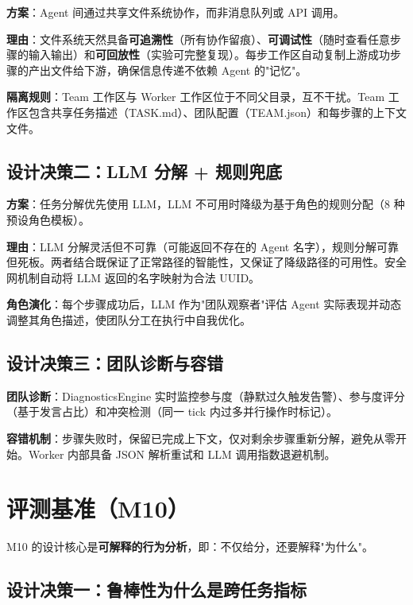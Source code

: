 \documentclass[12pt,a4paper]{article}%
\begin{document}
\textbf{方案}：Agent 间通过共享文件系统协作，而非消息队列或 API 调用。

\textbf{理由}：文件系统天然具备\textbf{可追溯性}（所有协作留痕）、\textbf{可调试性}（随时查看任意步骤的输入输出）和\textbf{可回放性}（实验可完整复现）。每步工作区自动复制上游成功步骤的产出文件给下游，确保信息传递不依赖 Agent 的"记忆"。

\textbf{隔离规则}：Team 工作区与 Worker 工作区位于不同父目录，互不干扰。Team 工作区包含共享任务描述（TASK.md）、团队配置（TEAM.json）和每步骤的上下文文件。

\subsection{设计决策二：LLM 分解 + 规则兜底}

\textbf{方案}：任务分解优先使用 LLM，LLM 不可用时降级为基于角色的规则分配（8 种预设角色模板）。

\textbf{理由}：LLM 分解灵活但不可靠（可能返回不存在的 Agent 名字），规则分解可靠但死板。两者结合既保证了正常路径的智能性，又保证了降级路径的可用性。安全网机制自动将 LLM 返回的名字映射为合法 UUID。

\textbf{角色演化}：每个步骤成功后，LLM 作为"团队观察者"评估 Agent 实际表现并动态调整其角色描述，使团队分工在执行中自我优化。

\subsection{设计决策三：团队诊断与容错}

\textbf{团队诊断}：DiagnosticsEngine 实时监控参与度（静默过久触发告警）、参与度评分（基于发言占比）和冲突检测（同一 tick 内过多并行操作时标记）。

\textbf{容错机制}：步骤失败时，保留已完成上下文，仅对剩余步骤重新分解，避免从零开始。Worker 内部具备 JSON 解析重试和 LLM 调用指数退避机制。

\section{评测基准（M10）}

M10 的设计核心是\textbf{可解释的行为分析}，即：不仅给分，还要解释"为什么"。

\subsection{设计决策一：鲁棒性为什么是跨任务指标}
\end{document}
